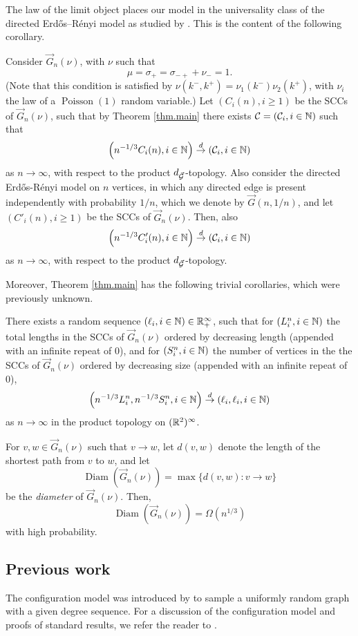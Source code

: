 The law of the limit object places our model in the universality class of the directed Erd\H{o}s--Rényi model as studied by \citet{goldschmidtScalingLimitCritical2019}. This is the content of the following corollary.
\begin{corollary}
Consider $\vec{G}_n(\nu)$, with $\nu$ such that $$\mu=\sigma_+=\sigma_{-+}+\nu_-=1.$$ (Note that this condition is satisfied by $\nu(k^-,k^+)=\nu_1(k^-)\nu_2(k^+)$, with $\nu_i$ the law of a $\operatorname{Poisson}(1)$ random variable.)
Let $(C_i(n), i\geq 1)$ be the SCCs of $\vec{G}_n(\nu)$, such that by Theorem \ref{thm.main} there exists ${\mathcal C}=({\mathcal C}_i,i\in {\mathbb N})$ such that 
$$\left(n^{-1/3}C_i(n),i\in {\mathbb N}\right)\overset{d}{\to}\left({\mathcal C}_i,i\in {\mathbb N}\right)$$
as $n\to \infty$, with respect to the product $d_{\vec{{\mathcal G}}}$-topology. Also consider the directed Erd\H{o}s-R\'enyi model on $n$ vertices, in which any directed edge is present independently with probability $1/n$, which we denote by $\vec{G}(n,1/n)$, and let $(C'_i(n), i\geq 1)$ be the SCCs of $\vec{G}_n(\nu)$. Then, also
$$\left(n^{-1/3}C'_i(n),i\in {\mathbb N}\right)\overset{d}{\to}\left({\mathcal C}_i,i\in {\mathbb N}\right)$$
as $n\to \infty$, with respect to the product $d_{\vec{{\mathcal G}}}$-topology. 
\end{corollary}
Moreover, Theorem \ref{thm.main} has the following trivial corollaries, which were previously unknown. 
\begin{corollary}
There exists a random sequence $(\ell_i,i\in {\mathbb N})\in {\mathbb R}_+^\infty$, such that for $(L^n_i,i\in {\mathbb N})$ the total lengths in the SCCs of $\vec{G}_n(\nu)$ ordered by decreasing length (appended with an infinite repeat of $0$), and for $(S^n_i,i\in{\mathbb N})$ the number of vertices in the the SCCs of $\vec{G}_n(\nu)$ ordered by decreasing size (appended with an infinite repeat of $0$),
$$\left(n^{-1/3}L^n_i,n^{-1/3}S^n_i, i\in {\mathbb N}\right)\overset{d}{\to}\left(\ell_i,\ell_i,i\in {\mathbb N}\right)$$
as $n\to \infty$ in the product topology on $({\mathbb R}^2)^\infty$. 
\end{corollary}
\begin{corollary}
For $v,w\in \vec{G}_n(\nu)$ such that $v\to w$, let $d(v,w)$ denote the length of the shortest path from $v$ to $w$, and let $$\operatorname{Diam}\left(\vec{G}_n(\nu)\right)=\max\{d(v,w):v\to w\}$$ be the \emph{diameter} of $\vec{G}_n(\nu)$. Then,  $$\operatorname{Diam}\left(\vec{G}_n(\nu)\right)=\Omega(n^{1/3})$$
with high probability.
\end{corollary}


\subsection{Previous work}
The configuration model was introduced by \citet{Bollobas1980} to sample a uniformly random graph with a given degree sequence. For a discussion of the configuration model and proofs of standard results, we refer the reader to \cite[Chapter 7]{hofstadRandomGraphsComplex2017}.

